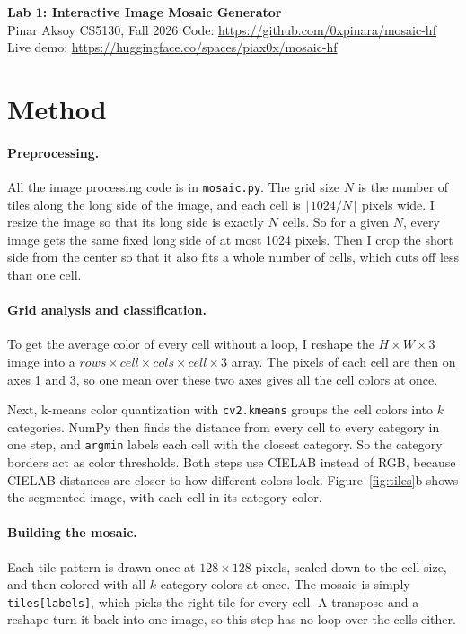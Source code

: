 \documentclass[10pt]{article}
\begin{document}
\begin{center}
  {\Large\bfseries Lab 1: Interactive Image Mosaic Generator}\\[4pt]
  Pinar Aksoy \quad CS5130, Fall 2026 \quad Code: \url{https://github.com/0xpinara/mosaic-hf}\\[2pt]
  Live demo: \url{https://huggingface.co/spaces/piax0x/mosaic-hf}
\end{center}
\suppressfloats[t]

\section{Method}

\paragraph{Preprocessing.}
All the image processing code is in \texttt{mosaic.py}. The grid size $N$ is the number of tiles along the long side of the image, and each cell is $\lfloor 1024/N \rfloor$ pixels wide. I resize the image so that its long side is exactly $N$ cells. So for a given $N$, every image gets the same fixed long side of at most 1024 pixels. Then I crop the short side from the center so that it also fits a whole number of cells, which cuts off less than one cell.

\paragraph{Grid analysis and classification.}
To get the average color of every cell without a loop, I reshape the $H \times W \times 3$ image into a $\mathit{rows} \times \mathit{cell} \times \mathit{cols} \times \mathit{cell} \times 3$ array. The pixels of each cell are then on axes 1 and 3, so one mean over these two axes gives all the cell colors at once.

Next, k-means color quantization with \texttt{cv2.kmeans} groups the cell colors into $k$ categories. NumPy then finds the distance from every cell to every category in one step, and \texttt{argmin} labels each cell with the closest category. So the category borders act as color thresholds. Both steps use CIELAB instead of RGB, because CIELAB distances are closer to how different colors look. Figure~\ref{fig:tiles}b shows the segmented image, with each cell in its category color.

\paragraph{Building the mosaic.}
Each tile pattern is drawn once at $128 \times 128$ pixels, scaled down to the cell size, and then colored with all $k$ category colors at once. The mosaic is simply \texttt{tiles[labels]}, which picks the right tile for every cell. A transpose and a reshape turn it back into one image, so this step has no loop over the cells either.
\end{document}
